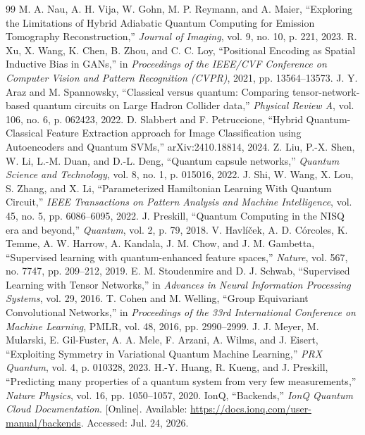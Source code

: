 \documentclass[journal]{IEEEtran}
\begin{document}
\begin{thebibliography}{99}
 M. A. Nau, A. H. Vija, W. Gohn, M. P. Reymann, and A. Maier, ``Exploring the Limitations of Hybrid Adiabatic Quantum Computing for Emission Tomography Reconstruction,'' \textit{Journal of Imaging}, vol. 9, no. 10, p. 221, 2023.
 R. Xu, X. Wang, K. Chen, B. Zhou, and C. C. Loy, ``Positional Encoding as Spatial Inductive Bias in GANs,'' in \textit{Proceedings of the IEEE/CVF Conference on Computer Vision and Pattern Recognition (CVPR)}, 2021, pp. 13564--13573.
 J. Y. Araz and M. Spannowsky, ``Classical versus quantum: Comparing tensor-network-based quantum circuits on Large Hadron Collider data,'' \textit{Physical Review A}, vol. 106, no. 6, p. 062423, 2022.
 D. Slabbert and F. Petruccione, ``Hybrid Quantum-Classical Feature Extraction approach for Image Classification using Autoencoders and Quantum SVMs,'' arXiv:2410.18814, 2024.
 Z. Liu, P.-X. Shen, W. Li, L.-M. Duan, and D.-L. Deng, ``Quantum capsule networks,'' \textit{Quantum Science and Technology}, vol. 8, no. 1, p. 015016, 2022.
 J. Shi, W. Wang, X. Lou, S. Zhang, and X. Li, ``Parameterized Hamiltonian Learning With Quantum Circuit,'' \textit{IEEE Transactions on Pattern Analysis and Machine Intelligence}, vol. 45, no. 5, pp. 6086--6095, 2022.
 J. Preskill, ``Quantum Computing in the NISQ era and beyond,'' \textit{Quantum}, vol. 2, p. 79, 2018.
 V. Havl{\'i}{\v c}ek, A. D. C{\'o}rcoles, K. Temme, A. W. Harrow, A. Kandala, J. M. Chow, and J. M. Gambetta, ``Supervised learning with quantum-enhanced feature spaces,'' \textit{Nature}, vol. 567, no. 7747, pp. 209--212, 2019.
 E. M. Stoudenmire and D. J. Schwab, ``Supervised Learning with Tensor Networks,'' in \textit{Advances in Neural Information Processing Systems}, vol. 29, 2016.
 T. Cohen and M. Welling, ``Group Equivariant Convolutional Networks,'' in \textit{Proceedings of the 33rd International Conference on Machine Learning}, PMLR, vol. 48, 2016, pp. 2990--2999.
 J. J. Meyer, M. Mularski, E. Gil-Fuster, A. A. Mele, F. Arzani, A. Wilms, and J. Eisert, ``Exploiting Symmetry in Variational Quantum Machine Learning,'' \textit{PRX Quantum}, vol. 4, p. 010328, 2023.
 H.-Y. Huang, R. Kueng, and J. Preskill, ``Predicting many properties of a quantum system from very few measurements,'' \textit{Nature Physics}, vol. 16, pp. 1050--1057, 2020.
 IonQ, ``Backends,'' \textit{IonQ Quantum Cloud Documentation}. [Online]. Available: \url{https://docs.ionq.com/user-manual/backends}. Accessed: Jul. 24, 2026.

\end{thebibliography}
\end{document}

